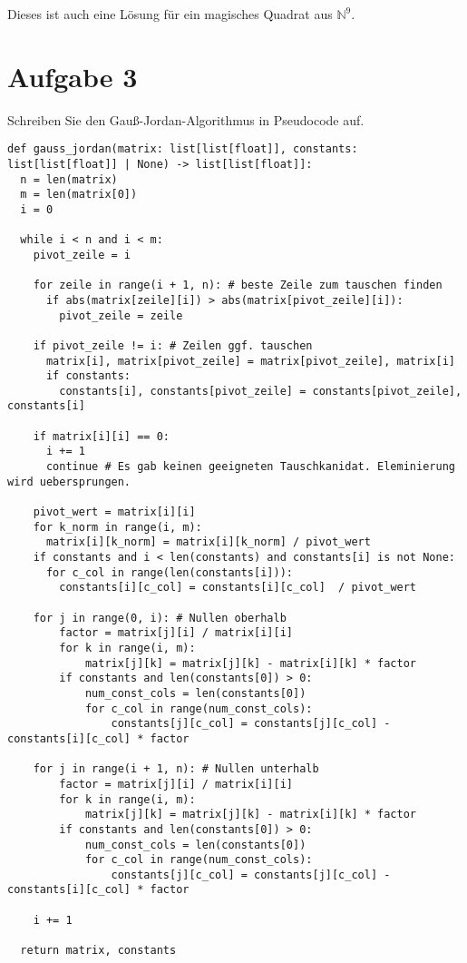 Dieses ist auch eine Lösung für ein magisches Quadrat aus $\mathbb{N}^9$.

\section{Aufgabe 3}
Schreiben Sie den Gauß-Jordan-Algorithmus in Pseudocode auf.
\begin{lstlisting}
def gauss_jordan(matrix: list[list[float]], constants: list[list[float]] | None) -> list[list[float]]:
  n = len(matrix)
  m = len(matrix[0])
  i = 0

  while i < n and i < m:
    pivot_zeile = i

    for zeile in range(i + 1, n): # beste Zeile zum tauschen finden
      if abs(matrix[zeile][i]) > abs(matrix[pivot_zeile][i]):
        pivot_zeile = zeile

    if pivot_zeile != i: # Zeilen ggf. tauschen
      matrix[i], matrix[pivot_zeile] = matrix[pivot_zeile], matrix[i]  
      if constants:
        constants[i], constants[pivot_zeile] = constants[pivot_zeile], constants[i]

    if matrix[i][i] == 0:
      i += 1
      continue # Es gab keinen geeigneten Tauschkanidat. Eleminierung wird uebersprungen.
        
    pivot_wert = matrix[i][i]
    for k_norm in range(i, m):
      matrix[i][k_norm] = matrix[i][k_norm] / pivot_wert
    if constants and i < len(constants) and constants[i] is not None:
      for c_col in range(len(constants[i])):
        constants[i][c_col] = constants[i][c_col]  / pivot_wert

    for j in range(0, i): # Nullen oberhalb
        factor = matrix[j][i] / matrix[i][i]
        for k in range(i, m):
            matrix[j][k] = matrix[j][k] - matrix[i][k] * factor
        if constants and len(constants[0]) > 0:
            num_const_cols = len(constants[0])
            for c_col in range(num_const_cols):
                constants[j][c_col] = constants[j][c_col] - constants[i][c_col] * factor

    for j in range(i + 1, n): # Nullen unterhalb
        factor = matrix[j][i] / matrix[i][i]
        for k in range(i, m):
            matrix[j][k] = matrix[j][k] - matrix[i][k] * factor
        if constants and len(constants[0]) > 0:
            num_const_cols = len(constants[0])
            for c_col in range(num_const_cols):
                constants[j][c_col] = constants[j][c_col] - constants[i][c_col] * factor
    
    i += 1

  return matrix, constants
  
\end{lstlisting}